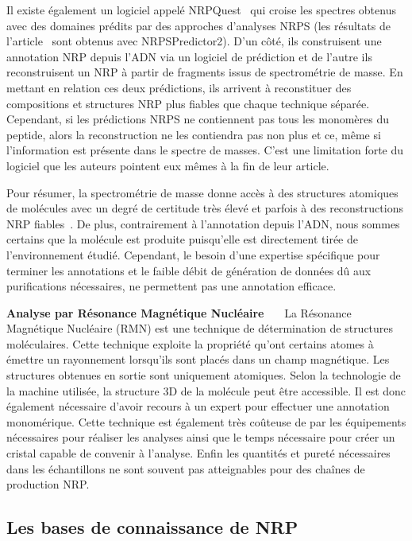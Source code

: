 Il existe également un logiciel appelé NRPQuest~\cite{mohimani_nrpquest:_2014} qui croise les spectres obtenus avec des domaines prédits par des approches d'analyses NRPS (les résultats de l'article~\cite{mohimani_nrpquest:_2014} sont obtenus avec NRPSPredictor2).
D'un côté, ils construisent une annotation NRP depuis l'ADN via un logiciel de prédiction et de l'autre ils reconstruisent un NRP à partir de fragments issus de spectrométrie de masse.
En mettant en relation ces deux prédictions, ils arrivent à reconstituer des compositions et structures NRP plus fiables que chaque technique séparée.
Cependant, si les prédictions NRPS ne contiennent pas tous les monomères du peptide, alors la reconstruction ne les contiendra pas non plus et ce, même si l'information est présente dans le spectre de masses.
C'est une limitation forte du logiciel que les auteurs pointent eux mêmes à la fin de leur article.

Pour résumer, la spectrométrie de masse donne accès à des structures atomiques de molécules avec un degré de certitude très élevé et parfois à des reconstructions NRP fiables~\cite{mohimani_dereplication_2015}.
De plus, contrairement à l'annotation depuis l'ADN, nous sommes certains que la molécule est produite puisqu'elle est directement tirée de l'environnement étudié.
Cependant, le besoin d'une expertise spécifique pour terminer les annotations et le faible débit de génération de données dû aux purifications nécessaires, ne permettent pas une annotation efficace.


\textbf{Analyse par Résonance Magnétique Nucléaire}~~~
La Résonance Magnétique Nucléaire (RMN) est une technique de détermination de structures moléculaires.
Cette technique exploite la propriété qu'ont certains atomes à émettre un rayonnement lorsqu'ils sont placés dans un champ magnétique.
Les structures obtenues en sortie sont uniquement atomiques.
Selon la technologie de la machine utilisée, la structure 3D de la molécule peut être accessible.
Il est donc également nécessaire d'avoir recours à un expert pour effectuer une annotation monomérique.
Cette technique est également très coûteuse de par les équipements nécessaires pour réaliser les analyses ainsi que le temps nécessaire pour créer un cristal capable de convenir à l'analyse.
Enfin les quantités et pureté nécessaires dans les échantillons ne sont souvent pas atteignables pour des chaînes de production NRP.



\subsection{Les bases de connaissance de NRP}


